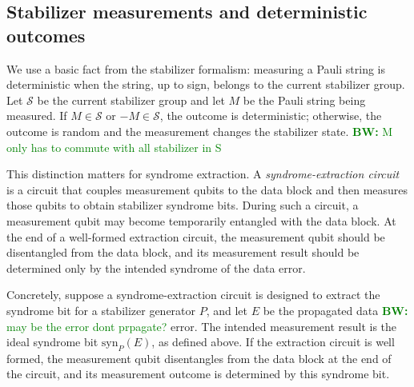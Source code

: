 \documentclass[acmsmall,screen,review,anonymous,nonacm]{acmart}
\newcommand{\showcomment}[1]{#1}
\newcommand{\bw}[1]{\showcomment{\textcolor{green}{\textbf{BW:} #1}}}
\begin{document}




\subsection{Stabilizer measurements and deterministic outcomes}

We use a basic fact from the stabilizer formalism: measuring a Pauli string is deterministic when the string, up to sign, belongs to the current stabilizer group. Let $\mathcal{S}$ be the current stabilizer group and let $M$ be the Pauli string being measured. If $M\in\mathcal{S}$ or $-M\in\mathcal{S}$, the outcome is deterministic; otherwise, the outcome is random and the measurement changes the stabilizer state.
\bw{M only has to commute with all stabilizer in S}


This distinction matters for syndrome extraction. A \emph{syndrome-extraction circuit} is a circuit that couples measurement qubits to the data block and then measures those qubits to obtain stabilizer syndrome bits.
During such a circuit, a measurement qubit may become temporarily entangled with the data block. At the end of a well-formed extraction circuit, the measurement qubit should be disentangled from the data block, and its measurement result should be determined only by the intended syndrome of the data error.

Concretely, suppose a syndrome-extraction circuit is designed to extract the syndrome bit for a stabilizer generator $P$, and let $E$ be the propagated data \bw{may be the error dont prpagate?} error. The intended measurement result is the ideal syndrome bit $\mathrm{syn}_P(E)$, as defined above. If the extraction circuit is well formed, the measurement qubit disentangles from the data block at the end of the circuit, and its measurement outcome is determined by this syndrome bit.
\end{document}
